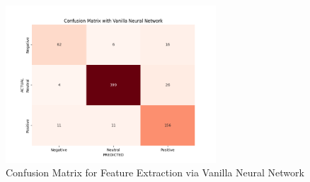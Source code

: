 \documentclass{article}
\begin{document}
\begin{figure}
    \centering
    \includegraphics[width=0.7\textwidth]{assets/conf_mat_for_nn.png}
    \caption{Confusion Matrix for Feature Extraction via Vanilla Neural Network}
    \label{fig:nn}
\end{figure}
\end{document}

